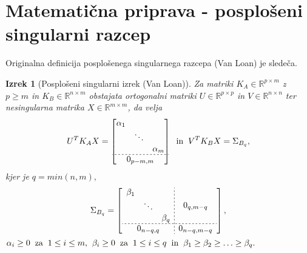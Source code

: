 \documentclass[mat1]{article}
\newtheorem{izrek}{Izrek}
\begin{document}
\section{Matematična priprava - posplošeni singularni razcep}
Originalna definicija posplošenega singularnega razcepa (Van Loan) je sledeča.

\begin{izrek}[Posplošeni singularni izrek (Van Loan)]
\label{izrek:SVD} Za matriki $K_A \in \mathbb{R}^{p \times m}$ z $p \geq m$ in $K_B \in \mathbb{R}^{n \times m}$ obstajata ortogonalni matriki $U \in \mathbb{R}^{p \times p}$ in $V \in \mathbb{R}^{n \times n}$ ter nesingularna matrika $X \in \mathbb{R}^{m \times m}$, da velja 
$$ U^T K_A X = 
\begin{bmatrix}
\begin{matrix}
\alpha_1 & & \\
 & \ddots & \\
 & & \alpha_m
\end{matrix} \\ \hdashline[2pt/2pt]
0_{p-m, m}
\end{bmatrix} 
\hspace{2mm} \text{in} \hspace{2mm}
 V^T K_B X = 
\Sigma_{B_q} \text{,}
$$ kjer je $q = min(n,m) \text{,}$
\begin{gather*}
\Sigma_{B_q} = 
\left[
\begin{array}{c;{2pt/2pt}c}
\begin{matrix}
\beta_1 & & \\
 & \ddots & \\
 & & \beta_q
\end{matrix} & 0_{q, m - q}
 \\ \hdashline[2pt/2pt]
0_{n-q, q} & 0_{n-q, m-q}
\end{array} \right] \text{,} 
\end{gather*} %
$
\alpha_i \geq 0 \hspace{2mm} \text{za} \hspace{2mm}
 1 \leq i \leq m \text{,} \hspace{2mm}
  \beta_i \geq 0 \hspace{2mm} \text{za} \hspace{2mm} 1 \leq i \leq q
\hspace{2mm} \text{in} \hspace{2mm} \beta_1 \geq \beta_2 \geq \ldots \geq \beta_q
\text{.}
$
\end{izrek}
\end{document}
